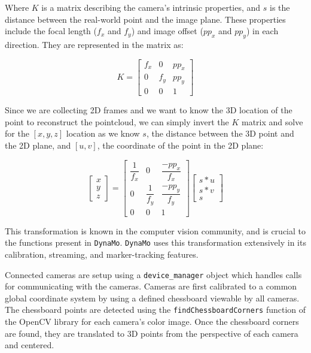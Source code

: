\documentclass[defaultstyle,11pt]{comps}
\begin{document}
Where \(K\) is a matrix describing the camera's intrinsic properties, and \(s\) is the distance between the real-world point and the image plane.
These properties include the focal length (\(f_{x}\) and \(f_{y}\)) and image offset (\(pp_{x}\) and \(pp_{y}\)) in each direction.
They are represented in the matrix as:

\begin{equation}{
K=\begin{bmatrix}f_{x}&0&pp_{x}\\0&f_{y}&pp_{y}\\0&0&1\end{bmatrix}
}\end{equation}

Since we are collecting 2D frames and we want to know the 3D location of the point to reconstruct the pointcloud, we can simply invert the \(K\) matrix and solve for the \([x,y,z]\) location as we know \(s\), the distance between the 3D point and the 2D plane, and \([u,v]\), the coordinate of the point in the 2D plane:

\begin{equation}{
\begin{bmatrix}x\\y\\z\end{bmatrix}=\begin{bmatrix}\dfrac{1}{f_{x}}&0&\dfrac{-pp_{x}}{f_{x}}\\0&\dfrac{1}{f_{y}}&\dfrac{-pp_{y}}{f_{y}}\\0&0&1\end{bmatrix}\begin{bmatrix}s*u\\s*v\\s\end{bmatrix}
}\end{equation}

This transformation is known in the computer vision community, and is crucial to the functions present in \texttt{DynaMo}.
\texttt{DynaMo} uses this transformation extensively in its calibration, streaming, and marker-tracking features.

Connected cameras are setup using a \texttt{device\_manager} object which handles calls for communicating with the cameras.
Cameras are first calibrated to a common global coordinate system by using a defined chessboard viewable by all cameras.
The chessboard points are detected using the \texttt{findChessboardCorners} function of the OpenCV library \citep{opencv_library} for each camera's color image.
Once the chessboard corners are found, they are translated to 3D points from the perspective of each camera and centered.
\end{document}
